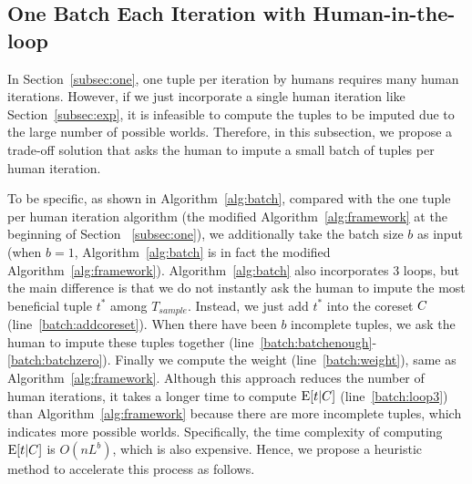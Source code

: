 




\subsection{One Batch Each Iteration with Human-in-the-loop}
\label{subsec:batch}

In Section~\ref{subsec:one}, one  tuple per iteration by humans  requires many human iterations. However, if we just incorporate a single human iteration like Section~\ref{subsec:exp}, it is infeasible to compute the tuples to be imputed due to the large number of possible worlds. Therefore, in this subsection, we propose a trade-off solution that asks the human to impute a small batch of tuples per human iteration.

To be specific, as shown in Algorithm~\ref{alg:batch}, compared with the one tuple per human iteration algorithm (\ie the modified Algorithm~\ref{alg:framework} at the beginning of Section ~\ref{subsec:one}), we additionally take the batch size $b$ as input (when $b=1$, Algorithm~\ref{alg:batch} is in fact the modified Algorithm~\ref{alg:framework}). Algorithm~\ref{alg:batch} also incorporates 3 loops, but the main difference is that we do not instantly ask the human to impute the most beneficial tuple $t^*$ among $T_{sample}$. Instead, we just add $t^*$ into the coreset $C$ (line~\ref{batch:addcoreset}). When there have been $b$ incomplete tuples, we ask the human to impute these tuples together (line~\ref{batch:batchenough}-\ref{batch:batchzero}). Finally we compute the weight (line~\ref{batch:weight}), same as  Algorithm~\ref{alg:framework}.  Although this approach reduces the number of human iterations, it takes a longer time to compute $\mathrm{E}[t|C]$ (line~\ref{batch:loop3}) than Algorithm~\ref{alg:framework} because there are more incomplete tuples, which indicates more possible worlds. Specifically, the time complexity of computing $\mathrm{E}[t|C]$ is $O(nL^b)$, which is also expensive. Hence, we propose a heuristic method to accelerate this process as follows. 

